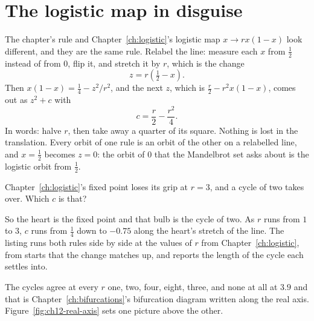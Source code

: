 \section{The logistic map in disguise}
\label{sec:ch12-logistic}

\noindent
The chapter's rule and Chapter~\ref{ch:logistic}'s logistic map
$x \to rx(1 - x)$ look different, and they are the same rule. Relabel the
line: measure each $x$ from $\tfrac12$ instead of from $0$, flip it, and
stretch it by $r$, which is the change
\[ z = r\left(\tfrac12 - x\right) . \]
Then $x(1 - x) = \tfrac14 - z^{2}/r^{2}$, and the next $z$, which is
$\tfrac{r}{2} - r^{2}x(1 - x)$, comes out as $z^{2} + c$ with
\[ c = \frac{r}{2} - \frac{r^{2}}{4} . \]
In words: halve $r$, then take away a quarter of its square. Nothing is lost
in the translation. Every orbit of one rule is an orbit of the other on a
relabelled line, and $x = \tfrac12$ becomes $z = 0$: the orbit of $0$ that
the Mandelbrot set asks about is the logistic orbit from $\tfrac12$.

\begin{think}
Chapter~\ref{ch:logistic}'s fixed point loses its grip at $r = 3$, and a
cycle of two takes over. Which $c$ is that?
\end{think}
So the heart is the fixed point and that bulb is the cycle of two. As $r$
runs from $1$ to $3$, $c$ runs from $\tfrac14$ down to $\num{-0.75}$ along the
heart's stretch of the line. The listing runs both rules side by side at
the values of $r$ from Chapter~\ref{ch:logistic}, from starts that the
change matches up, and reports the length of the cycle each settles into.



\noindent
The cycles agree at every $r$ \dash{} one, two, four, eight, three, and none
at all at $\num{3.9}$ \dash{} and that is Chapter~\ref{ch:bifurcations}'s
bifurcation diagram written along the real axis.
Figure~\ref{fig:ch12-real-axis} sets one picture above the other.



